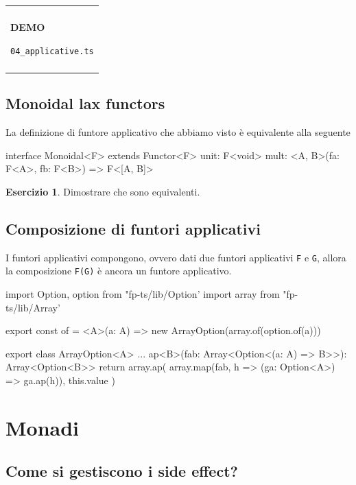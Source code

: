 \documentclass[12pt]{article}
\theoremstyle{definition}
\newtheorem{exercise}{Esercizio}[section]
\newenvironment{demo}
    {\begin{center}
    \begin{tabular}{|p{0.9\textwidth}|}
    \hline\\
    }
    {
    \\\\\hline
    \end{tabular}
    \end{center}
    }
\newenvironment{code}
  {\vspace{0.5cm} \VerbatimEnvironment\begin{typescriptcode}}
  {\end{typescriptcode} \vspace{0.2cm}}
\begin{document}
\begin{demo}
\begin{center}
\textbf{DEMO}

\texttt{04\_applicative.ts}
\end{center}
\end{demo}

\subsection{Monoidal lax functors}

La definizione di funtore applicativo che abbiamo visto è equivalente alla seguente

\begin{code}
interface Monoidal<F> extends Functor<F> {
  unit: F<void>
  mult: <A, B>(fa: F<A>, fb: F<B>) => F<[A, B]>
}
\end{code}

\begin{exercise}
Dimostrare che sono equivalenti.
\end{exercise}

\subsection{Composizione di funtori applicativi}

I funtori applicativi compongono, ovvero dati due funtori applicativi \texttt{F} e \texttt{G},
allora la composizione \texttt{F(G)} è ancora un funtore applicativo.

\begin{code}
import { Option, option } from "fp-ts/lib/Option'
import { array } from "fp-ts/lib/Array'

export const of = <A>(a: A) =>
  new ArrayOption(array.of(option.of(a)))

export class ArrayOption<A> {
  ...
  ap<B>(fab: Array<Option<(a: A) => B>>): Array<Option<B>> {
    return array.ap(
      array.map(fab, h => (ga: Option<A>) => ga.ap(h)),
      this.value
    )
  }
}
\end{code}

\newpage

\section{Monadi}

\subsection{Come si gestiscono i side effect?}
\end{document}
